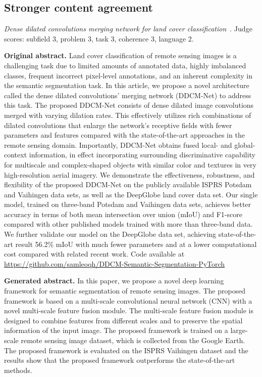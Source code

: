 \subsection{Stronger content agreement}
\textit{Dense dilated convolutions merging network for land cover classification}~\cite{liu2020ddcmnet}. Judge scores: subfield 3, problem 3, task 3, coherence 3, language 2.\nopagebreak[4]

\textbf{Original abstract.} Land cover classification of remote sensing images is a challenging task due to limited amounts of annotated data, highly imbalanced classes, frequent incorrect pixel-level annotations, and an inherent complexity in the semantic segmentation task. In this article, we propose a novel architecture called the dense dilated convolutions' merging network (DDCM-Net) to address this task. The proposed DDCM-Net consists of dense dilated image convolutions merged with varying dilation rates. This effectively utilizes rich combinations of dilated convolutions that enlarge the network's receptive fields with fewer parameters and features compared with the state-of-the-art approaches in the remote sensing domain. Importantly, DDCM-Net obtains fused local- and global-context information, in effect incorporating surrounding discriminative capability for multiscale and complex-shaped objects with similar color and textures in very high-resolution aerial imagery. We demonstrate the effectiveness, robustness, and flexibility of the proposed DDCM-Net on the publicly available ISPRS Potsdam and Vaihingen data sets, as well as the DeepGlobe land cover data set. Our single model, trained on three-band Potsdam and Vaihingen data sets, achieves better accuracy in terms of both mean intersection over union (mIoU) and F1-score compared with other published models trained with more than three-band data. We further validate our model on the DeepGlobe data set, achieving state-of-the-art result 56.2\% mIoU with much fewer parameters and at a lower computational cost compared with related recent work. Code available at \url{https://github.com/samleoqh/DDCM-Semantic-Segmentation-PyTorch}

\textbf{Generated abstract.} In this paper, we propose a novel deep learning framework for semantic segmentation of remote sensing images. The proposed framework is based on a multi-scale convolutional neural network (CNN) with a novel multi-scale feature fusion module. The multi-scale feature fusion module is designed to combine features from different scales and to preserve the spatial information of the input image. The proposed framework is trained on a large-scale remote sensing image dataset, which is collected from the Google Earth. The proposed framework is evaluated on the ISPRS Vaihingen dataset and the results show that the proposed framework outperforms the state-of-the-art methods.

